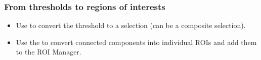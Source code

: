 \documentclass[ignorenonframetext,aspectratio=169,10pt,xcolor=table]{beamer}
\begin{document}
\begin{frame} \frametitle{From thresholds to regions of interests}
  \begin{itemize}
  \item Use  to convert the
    threshold to a selection (can be a composite selection).
  \item Use the  to convert
    connected components into individual ROIs and add them to the ROI
    Manager.
  \end{itemize}

\end{frame}
\end{document}
